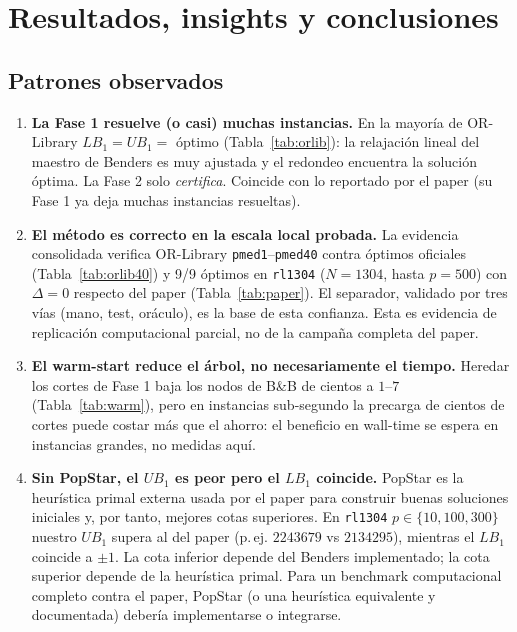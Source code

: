 \section{Resultados, insights y conclusiones}
\label{sec:resultados}

\subsection{Patrones observados}
\begin{enumerate}[leftmargin=1.5em]
  \item \textbf{La Fase 1 resuelve (o casi) muchas instancias.} En la mayoría de OR-Library
        $LB_1=UB_1=$ óptimo (Tabla~\ref{tab:orlib}): la relajación lineal del maestro de Benders es
        muy ajustada y el redondeo encuentra la solución óptima. La Fase 2 solo \emph{certifica}.
        Coincide con lo reportado por el paper (su Fase 1 ya deja muchas instancias resueltas).
  \item \textbf{El método es correcto en la escala local probada.} La evidencia consolidada
        verifica OR-Library \texttt{pmed1}--\texttt{pmed40} contra óptimos oficiales
        (Tabla~\ref{tab:orlib40}) y 9/9 óptimos en \texttt{rl1304} ($N=1304$, hasta $p=500$) con
        $\Delta=0$ respecto del paper (Tabla~\ref{tab:paper}). El separador, validado por tres
        vías (mano, test, oráculo), es la base de esta confianza. Esta es evidencia de replicación
        computacional parcial, no de la campaña completa del paper.
  \item \textbf{El warm-start reduce el árbol, no necesariamente el tiempo.} Heredar los cortes de
        Fase 1 baja los nodos de B\&B de cientos a $1$--$7$ (Tabla~\ref{tab:warm}), pero en
        instancias sub-segundo la precarga de cientos de cortes puede costar más que el ahorro: el
        beneficio en wall-time se espera en instancias grandes, no medidas aquí.
  \item \textbf{Sin PopStar, el $UB_1$ es peor pero el $LB_1$ coincide.} PopStar es la
        heurística primal externa usada por el paper para construir buenas soluciones iniciales y,
        por tanto, mejores cotas superiores. En \texttt{rl1304} $p\in\{10,100,300\}$ nuestro
        $UB_1$ supera al del paper (p.\,ej. $2243679$ vs $2134295$), mientras el $LB_1$ coincide a
        $\pm1$. La cota inferior depende del Benders implementado; la cota superior depende de la
        heurística primal. Para un benchmark computacional completo contra el paper, PopStar (o
        una heurística equivalente y documentada) debería implementarse o integrarse.
\end{enumerate}

